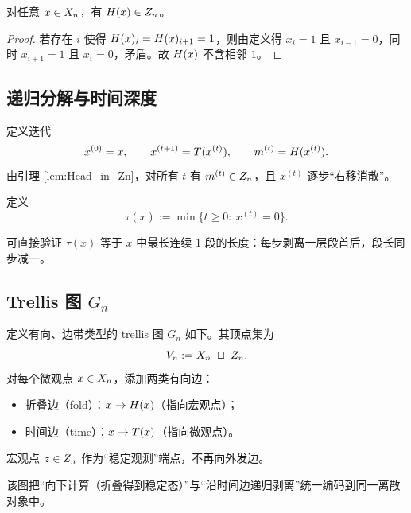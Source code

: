 \begin{lemma}[稳定性]\label{lem:Head_in_Zn}
对任意 $x\in X_n$，有 $H(x)\in Z_n$。
\end{lemma}

\begin{proof}
若存在 $i$ 使得 $H(x)_i=H(x)_{i+1}=1$，则由定义得 $x_i=1$ 且 $x_{i-1}=0$，同时 $x_{i+1}=1$ 且 $x_i=0$，矛盾。故 $H(x)$ 不含相邻 $1$。
\end{proof}

\subsection{递归分解与时间深度}

定义迭代
$$
x^{(0)}=x,\qquad x^{(t+1)}=T(x^{(t)}),\qquad m^{(t)}=H(x^{(t)}).
$$
由引理 \ref{lem:Head_in_Zn}，对所有 $t$ 有 $m^{(t)}\in Z_n$，且 $x^{(t)}$ 逐步“右移消散”。

\begin{definition}[时间深度]\label{def:tau}
定义
$$
\tau(x):=\min\{t\ge 0:\ x^{(t)}=0\}.
$$
\end{definition}

\begin{remark}
可直接验证 $\tau(x)$ 等于 $x$ 中最长连续 $1$ 段的长度：每步剥离一层段首后，段长同步减一。
\end{remark}

\subsection{Trellis 图 $G_n$}

\begin{definition}\label{def:trellis}
定义有向、边带类型的 trellis 图 $G_n$ 如下。其顶点集为
$$
V_n:=\Xn\ \sqcup\ \Zn.
$$
对每个微观点 $x\in X_n$，添加两类有向边：
\begin{itemize}
  \item 折叠边（fold）：$x\to H(x)$（指向宏观点）；
  \item 时间边（time）：$x\to T(x)$（指向微观点）。
\end{itemize}
宏观点 $z\in Z_n$ 作为“稳定观测”端点，不再向外发边。
\end{definition}

该图把“向下计算（折叠得到稳定态）”与“沿时间边递归剥离”统一编码到同一离散对象中。

